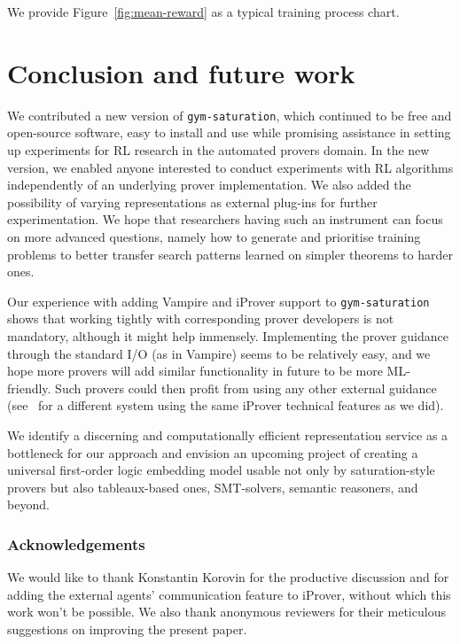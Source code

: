 \documentclass[runningheads]{llncs}
\begin{document}
We provide Figure~\ref{fig:mean-reward} as a typical training process chart.

\section{Conclusion and future work}
We contributed a new version of \texttt{gym-saturation}, which continued to be free and open-source software, easy to install and use while promising assistance in setting up experiments for RL research in the automated provers domain. In the new version, we enabled anyone interested to conduct experiments with RL algorithms independently of an underlying prover implementation. We also added the possibility of varying representations as external plug-ins for further experimentation. We hope that researchers having such an instrument can focus on more advanced questions, namely how to generate and prioritise training problems to better transfer search patterns learned on simpler theorems to harder ones.

Our experience with adding Vampire and iProver support to \texttt{gym-saturation} shows that working tightly with corresponding prover developers is not mandatory, although it might help immensely. Implementing the prover guidance through the standard I/O (as in Vampire) seems to be relatively easy, and we hope more provers will add similar functionality in future to be more ML-friendly. Such provers could then profit from using any other external guidance (see~\cite{LPAR2023:Guiding_an_Instantiation_Prover} for a different system using the same iProver technical features as we did).

We identify a discerning and computationally efficient representation service as a bottleneck for our approach and envision an upcoming project of creating a universal first-order logic embedding model usable not only by saturation-style provers but also tableaux-based ones, SMT-solvers, semantic reasoners, and beyond.
\subsubsection{Acknowledgements} We would like to thank Konstantin Korovin for the productive discussion and for adding the external agents' communication feature to iProver, without which this work won't be possible. We also thank anonymous reviewers for their meticulous suggestions on improving the present paper.

%
%
%


%
\end{document}
